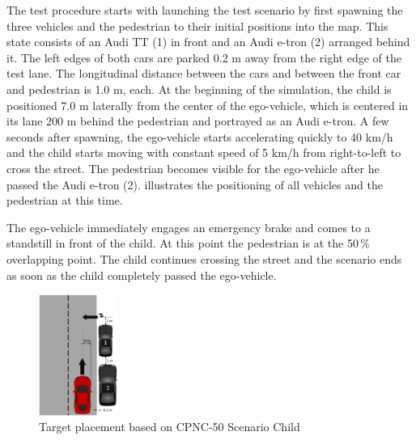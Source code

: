 The test procedure starts with launching the test scenario by first spawning the three vehicles and the pedestrian to their initial positions into the map. This state consists of an Audi TT (1) in front and an Audi e-tron (2) arranged behind it. The left edges of both cars are parked 0.2 m away from the right edge of the test lane. The longitudinal distance between the cars and between the front car and pedestrian is 1.0 m, each. At the beginning of the simulation, the child is positioned 7.0 m laterally from the center of the ego-vehicle, which is centered in its lane 200 m behind the pedestrian and portrayed as an Audi e-tron. A few seconds after spawning, the ego-vehicle starts accelerating quickly to 40 km/h and the child starts moving with constant speed of 5 km/h from right-to-left to cross the street. The pedestrian becomes visible for the ego-vehicle after he passed the Audi e-tron (2).  illustrates the positioning of all vehicles and the pedestrian at this time.

The ego-vehicle immediately engages an emergency brake and comes to a standstill in front of the child. At this point the pedestrian is at the 50\,\% overlapping point. The child continues crossing the street and the scenario ends as soon as the child completely passed the ego-vehicle.
\begin{figure}[b]
	\centering
	\includegraphics[width=0.23\textwidth]{images/Target_Placement_test_scenario.png}
	\caption{Target placement based on CPNC-50 Scenario Child \cite{Protocoll}}
	\label{fig:coordination}
\end{figure}

